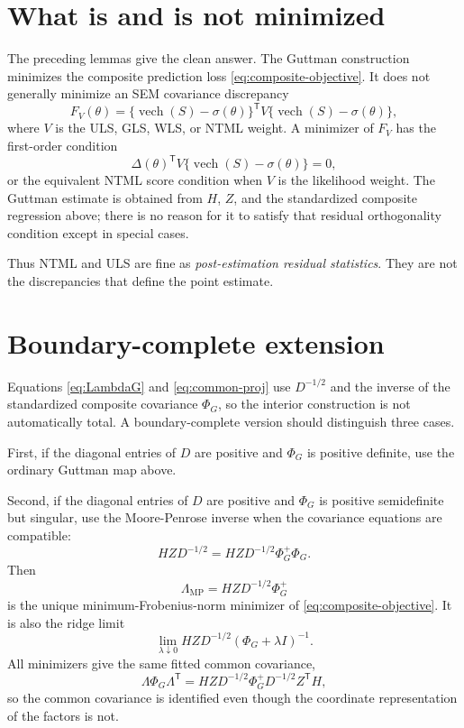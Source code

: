 \documentclass[11pt]{article}
\newcommand{\T}{^{\mathsf T}}
\newcommand{\vech}{\operatorname{vech}}
\theoremstyle{plain}
\theoremstyle{remark}
\begin{document}
\section{What is and is not minimized}

The preceding lemmas give the clean answer. The Guttman construction minimizes
the composite prediction loss \eqref{eq:composite-objective}. It does not generally
minimize an SEM covariance discrepancy
\[
  F_V(\theta)
  =
  \{\vech(S)-\sigma(\theta)\}\T
  V
  \{\vech(S)-\sigma(\theta)\},
\]
where \(V\) is the ULS, GLS, WLS, or NTML weight. A minimizer of \(F_V\) has the
first-order condition
\[
  \Delta(\theta)\T V
  \{\vech(S)-\sigma(\theta)\}=0,
\]
or the equivalent NTML score condition when \(V\) is the likelihood weight. The
Guttman estimate is obtained from \(H\), \(Z\), and the standardized composite
regression above; there is no reason for it to satisfy that residual
orthogonality condition except in special cases.

Thus NTML and ULS are fine as \emph{post-estimation residual statistics}. They
are not the discrepancies that define the point estimate.

\section{Boundary-complete extension}

Equations \eqref{eq:LambdaG} and \eqref{eq:common-proj} use \(D^{-1/2}\) and
the inverse of the standardized composite covariance \(\Phi_G\), so the
interior construction is not automatically total. A boundary-complete version
should distinguish three cases.

First, if the diagonal entries of \(D\) are positive and \(\Phi_G\) is positive
definite, use the ordinary Guttman map above.

Second, if the diagonal entries of \(D\) are positive and \(\Phi_G\) is
positive semidefinite but singular, use the Moore-Penrose inverse when the
covariance equations are compatible:
\begin{equation}\label{eq:compat}
  HZD^{-1/2}=HZD^{-1/2}\Phi_G^{+}\Phi_G .
\end{equation}
Then
\[
  \Lambda_{\mathrm{MP}}=HZD^{-1/2}\Phi_G^{+}
\]
is the unique minimum-Frobenius-norm minimizer of
\eqref{eq:composite-objective}. It is also the ridge limit
\[
  \lim_{\lambda\downarrow0}HZD^{-1/2}(\Phi_G+\lambda I)^{-1}.
\]
All minimizers give the same fitted common covariance,
\[
  \Lambda\Phi_G\Lambda\T
  =
  HZD^{-1/2}\Phi_G^{+}D^{-1/2}Z\T H ,
\]
so the common covariance is identified even though the coordinate
representation of the factors is not.
\end{document}
